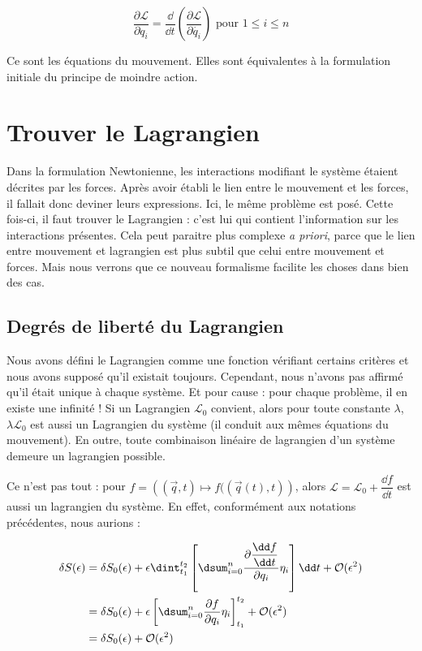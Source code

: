 \begin{equation}
  \dfrac{\partial \mathcal{L}}{\partial q_i} = \dfrac{\dd}{\dd t} \left ( \dfrac{\partial \mathcal{L}}{\partial \dot{q_i}} \right ) \textrm{ pour } 1\leq i \leq n
\end{equation}

Ce sont les équations du mouvement. Elles sont équivalentes à la formulation initiale du principe de moindre action.

\section{Trouver le Lagrangien}

Dans la formulation Newtonienne, les interactions modifiant le système étaient décrites par les forces. Après avoir établi le lien entre le mouvement et les forces, il fallait donc \og deviner \fg leurs expressions. Ici, le même problème est posé. Cette fois-ci, il faut trouver le Lagrangien : c'est lui qui contient l'information sur les interactions présentes. Cela peut paraitre plus complexe \textit{a priori}, parce que le lien entre mouvement et lagrangien est plus subtil que celui entre mouvement et forces. Mais nous verrons que ce nouveau formalisme facilite les choses dans bien des cas.

\subsection{Degrés de liberté du Lagrangien}

Nous avons défini le Lagrangien comme une fonction vérifiant certains critères et nous avons supposé qu'il existait toujours. Cependant, nous n'avons pas affirmé qu'il était unique à chaque système. Et pour cause : pour chaque problème, il en existe une infinité ! Si un Lagrangien  $\mathcal{L}_0$ convient, alors pour toute constante $\lambda$, $\lambda \mathcal{L}_0$ est aussi un Lagrangien du système (il conduit aux mêmes équations du mouvement). 
En outre, toute combinaison linéaire de lagrangien d'un système demeure un lagrangien possible.

 Ce n'est pas tout : pour $f = \left ((\vec{q}, t) \mapsto f((\vec{q}(t), t) \right )$, alors $\mathcal{L} = \mathcal{L}_0 + \dfrac{\dd f}{\dd t}$ est aussi un lagrangien du système. En effet, conformément aux notations précédentes, nous aurions :

\begin{equation}
\begin{split}
\delta S (\epsilon) & = \delta S_0 (\epsilon ) + \epsilon \dint_{t_1}^{t_2} \left [ \dsum_{i=0}^{n} \dfrac{\partial  \dfrac{\dd f}{\dd t}}{\partial q_i} \eta_i \right ] \dd t + \mathcal{O}(\epsilon^2) \\
&= \delta S_0(\epsilon) + \epsilon \left [ \dsum_{i=0}^{n} \dfrac{\partial  f}{\partial q_i} \eta_i \right ]_{t_1}^{t_2} + \mathcal{O}(\epsilon^2) \\
&= \delta S_0 (\epsilon ) + \mathcal{O}(\epsilon^2)
\end{split}
\end{equation}

